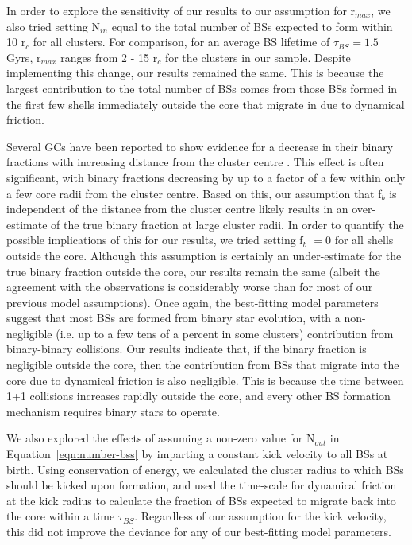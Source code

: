 In order to explore the sensitivity of our results to our assumption
for r$_{max}$, we also tried setting N$_{in}$ equal to the total
number of BSs expected to form within 10 r$_c$ for all clusters.  For
comparison, for an average BS lifetime of $\tau_{BS} = 1.5$ Gyrs,
r$_{max}$ ranges from 2 - 15 r$_c$ for the clusters in our
sample.  Despite implementing this change, our results remained the
same.  This is because the largest contribution to the total number of
BSs comes from those BSs formed in the first few shells
immediately outside the core that migrate in due to dynamical
friction.

Several GCs have been reported to show evidence for a decrease in
their binary fractions with increasing distance from the cluster
centre \citep[e.g.][]{sollima07, davis08}.  This effect is often
significant, with binary fractions decreasing by up to a factor of a
few within only a few core radii from the cluster centre.  Based on
this, our assumption that f$_b$ is independent of the distance
from the cluster centre likely results in an over-estimate of the true
binary fraction at large cluster radii.  In order to
quantify the possible implications of this for our results, we tried
setting f$_b$ $= 0$ for all shells outside the core.  Although this
assumption is certainly an under-estimate for the true binary fraction
outside the core, our results remain the same (albeit the agreement
with the observations is considerably worse than for most of our previous
model assumptions).  Once again, the
best-fitting model parameters suggest that most BSs are formed from
binary star evolution, with a non-negligible (i.e. up to a few tens of
a percent in some clusters) contribution from
binary-binary collisions.  Our results indicate that, if the
binary fraction is negligible outside the core, then the contribution
from BSs that migrate into the core due to dynamical friction is also
negligible.  This is because the time between 1+1 collisions increases
rapidly outside the core, and every other BS formation mechanism requires
binary stars to operate.  %

We also explored the effects of assuming a non-zero value for
N$_{out}$ in Equation~\ref{eqn:number-bss} by imparting a constant
kick velocity to all
BSs at birth.  Using conservation of energy, we calculated the
cluster radius to which BSs should be kicked upon formation, and used
the time-scale for dynamical friction at the kick radius to calculate
the fraction of BSs expected to migrate back into the core within
a time $\tau_{BS}$.  Regardless of our assumption for the kick
velocity, this did not improve the deviance for any of our
best-fitting model parameters.

